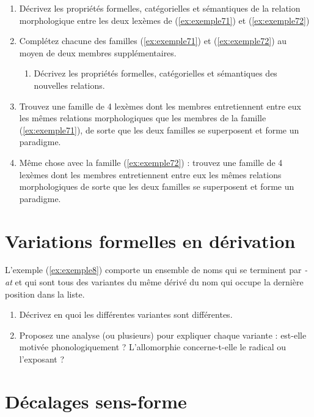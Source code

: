 \begin{enumerate}
\item Décrivez les propriétés formelles, catégorielles et sémantiques de la relation morphologique entre les deux lexèmes de (\ref{ex:exemple71}) et (\ref{ex:exemple72}) 
\item Complétez chacune des familles (\ref{ex:exemple71}) et (\ref{ex:exemple72})  au moyen de deux membres supplémentaires.
  \begin{enumerate}
  \item Décrivez les propriétés formelles, catégorielles et sémantiques des nouvelles relations.
  \end{enumerate}
\item Trouvez une famille de 4 lexèmes dont les membres entretiennent entre eux les mêmes relations morphologiques que les membres de la famille  (\ref{ex:exemple71}), de sorte que les deux familles se superposent et forme un paradigme.
\item Même chose avec la famille  (\ref{ex:exemple72}) : trouvez une famille de 4 lexèmes dont les membres entretiennent entre eux les mêmes relations morphologiques de sorte que les deux familles se superposent et forme un paradigme.
\end{enumerate}

\section{Variations formelles en dérivation}

L'exemple (\ref{ex:exemple8})  comporte un ensemble de noms qui se terminent par \emph{-at} et qui sont tous des variantes du même dérivé du  nom qui occupe la dernière position dans la liste. 

\begin{exe}
  \ex \label{ex:exemple8}\exhuit
\end{exe}

\begin{enumerate}
\item Décrivez en quoi les différentes variantes sont différentes.
\item Proposez une analyse (ou plusieurs) pour expliquer chaque variante : est-elle motivée phonologiquement ? L'allomorphie concerne-t-elle le radical ou l'exposant ?
\end{enumerate}

\section{Décalages sens-forme}

